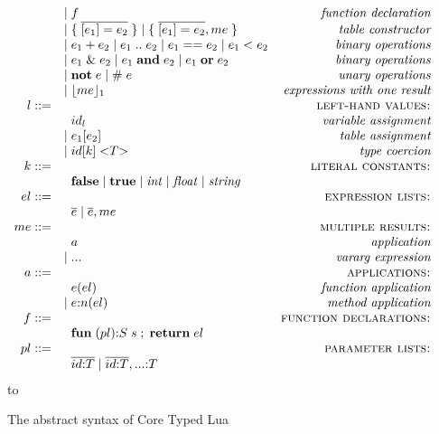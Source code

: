 \documentclass{sigplanconf}
\def\dend{\hbox to \hsize{\vrule height 4pt\hrulefill\vrule height 4pt}}
\begin{document}
\begin{figure*}[!ht]
$$\begin{array}{rlr}
	& | \; f & \textit{function declaration}\\
	& | \; \{ \; \overline{[e_{1}] = e_{2}} \; \} \;
	| \; \{ \; \overline{[e_{1}] = e_{2}},me \; \} & \textit{table constructor}\\
	& | \; e_{1} + e_{2} \;
	| \; e_{1} \; {..} \; e_{2} \;
	| \; e_{1} == e_{2} \;
	| \; e_{1} < e_{2} & \textit{binary operations}\\
	& | \; e_{1} \;\&\; e_{2} \;
	| \; e_{1} \; \mathbf{and} \; e_{2} \;
	| \; e_{1} \; \mathbf{or} \; e_{2} & \textit{binary operations}\\
	& | \; \mathbf{not} \; e \;
	| \; \# \; e & \textit{unary operations} \\
	& | \; \lfloor me \rfloor_{1} & \textit{expressions with one result}\\
	l ::= & & \textsc{left-hand values:}\\
	& \;\; id_{l} & \textit{variable assignment}\\
	& | \; e_{1}[e_{2}] & \textit{table assignment}\\
	& | \; id[k] \; {<}T{>} & \textit{type coercion}\\
	k ::= & & \textsc{literal constants:}\\
	& \;\; \mathbf{false} \; | \;
	\mathbf{true} \; | \;
	{\it int} \; | \;
	{\it float} \; | \;
	{\it string} & \\
	el ::= & & \textsc{expression lists:}\\
	& \;\; \overline{e} \; | \;
	\overline{e}, me & \\
	me ::= & & \textsc{multiple results:}\\
	& \;\; a & \textit{application}\\
	& | \; {...} & \textit{vararg expression}\\
	a ::= & & \textsc{applications:}\\
	& \;\; e(el) & \textit{function application}\\
	& | \; e{:}n(el) & \textit{method application}\\
	f ::= & & \textsc{function declarations:}\\
	& \;\; \mathbf{fun} \; (pl){:}S \; s \;;\; \mathbf{return} \; el & \\
	pl ::= & & \textsc{parameter lists:}\\
	& \;\; \overline{id{:}T} \; | \;
	\overline{id{:}T},{...}{:}T & \\
	\end{array}
	$$
	\dend
	\caption{The abstract syntax of Core Typed Lua}
	\label{fig:syntax}
\end{figure*}
\end{document}
